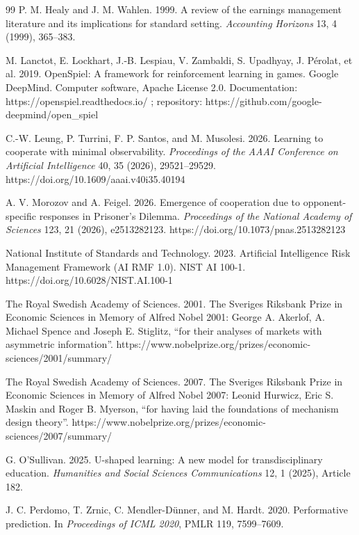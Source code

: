\begin{thebibliography}{99}
P. M. Healy and J. M. Wahlen. 1999.
A review of the earnings management literature and its implications for standard setting.
\emph{Accounting Horizons} 13, 4 (1999), 365--383.

M. Lanctot, E. Lockhart, J.-B. Lespiau, V. Zambaldi, S. Upadhyay, J. Pérolat, et al. 2019.
OpenSpiel: A framework for reinforcement learning in games.
Google DeepMind. Computer software, Apache License 2.0.
Documentation: https://openspiel.readthedocs.io/ ;
repository: https://github.com/google-deepmind/open\_spiel

C.-W. Leung, P. Turrini, F. P. Santos, and M. Musolesi. 2026.
Learning to cooperate with minimal observability.
\emph{Proceedings of the AAAI Conference on Artificial Intelligence} 40, 35 (2026), 29521--29529.
https://doi.org/10.1609/aaai.v40i35.40194

A. V. Morozov and A. Feigel. 2026.
Emergence of cooperation due to opponent-specific responses in Prisoner's Dilemma.
\emph{Proceedings of the National Academy of Sciences} 123, 21 (2026), e2513282123.
https://doi.org/10.1073/pnas.2513282123

National Institute of Standards and Technology. 2023.
Artificial Intelligence Risk Management Framework (AI RMF 1.0).
NIST AI 100-1.
https://doi.org/10.6028/NIST.AI.100-1

The Royal Swedish Academy of Sciences. 2001.
The Sveriges Riksbank Prize in Economic Sciences in Memory of Alfred Nobel 2001:
George A. Akerlof, A. Michael Spence and Joseph E. Stiglitz, ``for their analyses
of markets with asymmetric information''.
https://www.nobelprize.org/prizes/economic-sciences/2001/summary/

The Royal Swedish Academy of Sciences. 2007.
The Sveriges Riksbank Prize in Economic Sciences in Memory of Alfred Nobel 2007:
Leonid Hurwicz, Eric S. Maskin and Roger B. Myerson, ``for having laid the
foundations of mechanism design theory''.
https://www.nobelprize.org/prizes/economic-sciences/2007/summary/

G. O'Sullivan. 2025.
U-shaped learning: A new model for transdisciplinary education.
\emph{Humanities and Social Sciences Communications} 12, 1 (2025), Article 182.

J. C. Perdomo, T. Zrnic, C. Mendler-Dünner, and M. Hardt. 2020.
Performative prediction.
In \emph{Proceedings of ICML 2020}, PMLR 119, 7599--7609.


\end{thebibliography}
